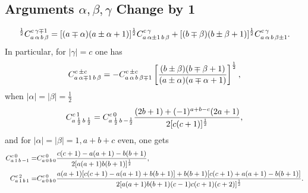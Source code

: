 \subsection{Arguments $\alpha, \beta, \gamma$ Change by 1}\label{sec:8.6.2}
\begin{equation}
[(c \pm \gamma)(c \mp \gamma+1)]^{\frac{1}{2}} \clebsch{a}{\alpha}{b}{\beta}{c}{\gamma \mp 1}=[(a \mp \alpha)(a \pm \alpha+1)]^{\frac{1}{2}} \clebsch{a}{\alpha \pm 1}{b}{\beta}{c}{\gamma}+[(b \mp \beta)(b \pm \beta+1)]^{\frac{1}{2}} \clebsch{a}{\alpha}{b}{\beta \pm 1}{c}{\gamma}. \label{eq:8:6:4}
\end{equation}
In particular, for $|\gamma|=c$ one has
\begin{equation}
C_{a\,\alpha \mp 1\, b\,\beta}^{c\, \pm c}=-
C_{a\,\alpha\, b\,\beta\mp 1}^{c\,\pm c}\left[\frac{(b \pm \beta)(b \mp \beta+1)}{(a \pm \alpha)(a \mp \alpha+1)}\right]^{\frac{1}{2}}, \label{eq:8:6:5}
\end{equation}
when $|\alpha|=|\beta|=\frac{1}{2}$
\begin{equation}
C_{a\,\frac{1}{2}\,b\,\frac{1}{2}}^{c\,1}=C_{a\,\frac{1}{2}\,b\,-\frac{1}{2}}^{c\,0} \frac{(2 b+1)+(-1)^{a+b-c}(2 a+1)}{2[c(c+1)]^{\frac{1}{2}}}, \label{eq:8:6:6}
\end{equation}
and for $|\alpha|=|\beta|=1, a+b+c$ even, one gets
\begin{align}
C_{a\,1\,b\,-1}^{c\,0}=&C_{a\,0\,b\,0}^{c\,0} \frac{c(c+1)-a(a+1)-b(b+1)}{2[a(a+1) b(b+1)]^{\frac{1}{2}}}, \label{eq:8:6:7}\\
C_{a\,1\,b\,1}^{c\,2}=&C_{a\,0\,b\,0}^{c\,0} \frac{a(a+1)[c(c+1)-a(a+1)+b(b+1)]+b(b+1)[c(c+1)+a(a+1)-b(b+1)]}{2[a(a+1) b(b+1)(c-1) c(c+1)(c+2)]^{\frac{1}{2}}}. \label{eq:8:6:8}
\end{align}
